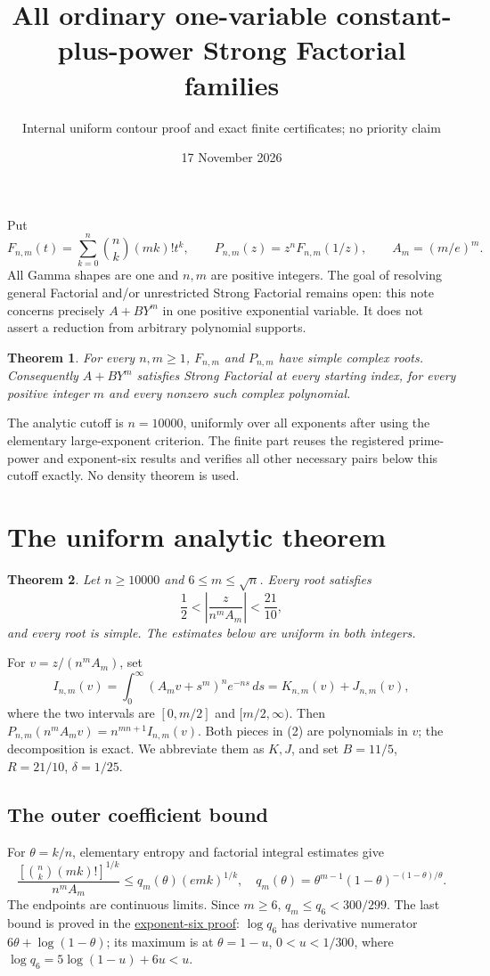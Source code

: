 \documentclass[11pt]{article}
\title{All ordinary one-variable constant-plus-power Strong Factorial families}
\author{Internal uniform contour proof and exact finite certificates; no priority claim}
\date{17 November 2026}
\newtheorem{theorem}{Theorem}
\begin{document}
\maketitle
Put
\[
 F_{n,m}(t)=\sum_{k=0}^n\binom nk(mk)!t^k,\qquad
 P_{n,m}(z)=z^nF_{n,m}(1/z),\qquad A_m=(m/e)^m.
\]
All Gamma shapes are one and $n,m$ are positive integers. The goal of
resolving general Factorial and/or unrestricted Strong Factorial remains
open: this note concerns precisely $A+BY^m$ in one positive exponential
variable. It does not assert a reduction from arbitrary polynomial supports.

\begin{theorem}\label{thm:all}
For every $n,m\ge1$, $F_{n,m}$ and $P_{n,m}$ have simple complex roots.
Consequently $A+BY^m$ satisfies Strong Factorial at every starting index,
for every positive integer $m$ and every nonzero such complex polynomial.
\end{theorem}
The analytic cutoff is $n=10000$, uniformly over all exponents after using
the elementary large-exponent criterion. The finite part reuses the
registered prime-power and exponent-six results and verifies all other
necessary pairs below this cutoff exactly. No density theorem is used.

\section{The uniform analytic theorem}
\begin{theorem}\label{thm:analytic}
Let $n\ge10000$ and $6\le m\le\sqrt n$. Every root satisfies
\[
             \frac12<\left|\frac{z}{n^m A_m}\right|<\frac{21}{10},
                                                               \tag{1}
\]
and every root is simple. The estimates below are uniform in both integers.
\end{theorem}
For $v=z/(n^m A_m)$, set
\[
 I_{n,m}(v)=\int_0^\infty(A_mv+s^m)^ne^{-ns}\,ds
           =K_{n,m}(v)+J_{n,m}(v),                    \tag{2}
\]
where the two intervals are $[0,m/2]$ and $[m/2,\infty)$.
Then $P_{n,m}(n^mA_mv)=n^{mn+1}I_{n,m}(v)$.
Both pieces in (2) are polynomials in $v$; the decomposition is exact.
We abbreviate them as $K,J$, and set $B=11/5$, $R=21/10$, $\delta=1/25$.

\subsection{The outer coefficient bound}
For $\theta=k/n$, elementary entropy and factorial integral estimates give
\[
 \frac{[\binom nk(mk)!]^{1/k}}{n^mA_m}
 \le q_m(\theta)(emk)^{1/k},\quad
 q_m(\theta)=\theta^{m-1}(1-\theta)^{-(1-\theta)/\theta}.
                                                               \tag{3}
\]
The endpoints are continuous limits. Since $m\ge6$, $q_m\le q_6<300/299$.
The last bound is proved in the
\href{EFFECTIVE_EXPONENT_SIX_SIMPLICITY.tex}{exponent-six proof}:
$\log q_6$ has derivative numerator $6\theta+\log(1-\theta)$;
its maximum is at $\theta=1-u$, $0<u<1/300$, where
$\log q_6=5\log(1-u)+6u<u$.
\end{document}
